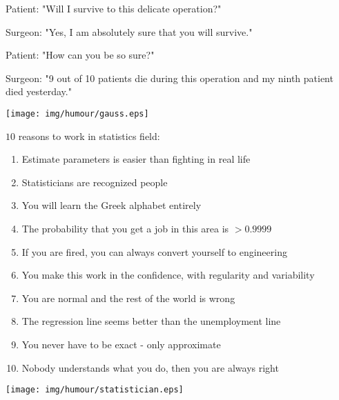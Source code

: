 Patient: "Will I survive to this delicate operation?"

Surgeon: "Yes, I am absolutely sure that you will survive."

Patient: "How can you be so sure?"

Surgeon: "9 out of 10 patients die during this operation and my ninth patient died yesterday."
\begin{center}\underline{\hspace{5 cm}}\end{center}
	\begin{center}
	\texttt{[image: img/humour/gauss.eps]}
	\end{center}

\pagebreak
$10$ reasons to work in statistics field:
\begin{enumerate}
	\item Estimate parameters is easier than fighting in real life

	\item Statisticians are recognized people

	\item You will learn the Greek alphabet entirely

	\item The probability that you get a job in this area is $> 0.9999$

	\item If you are fired, you can always convert yourself to engineering

	\item You make this work in the confidence, with regularity and variability

	\item You are normal and the rest of the world is wrong

	\item The regression line seems better than the unemployment line

	\item You never have to be exact - only approximate

	\item Nobody understands what you do, then you are always right
\end{enumerate} 

	\begin{center}\underline{\hspace{5 cm}}\end{center}
	\begin{center}
	\texttt{[image: img/humour/statistician.eps]}
	\end{center}
	
